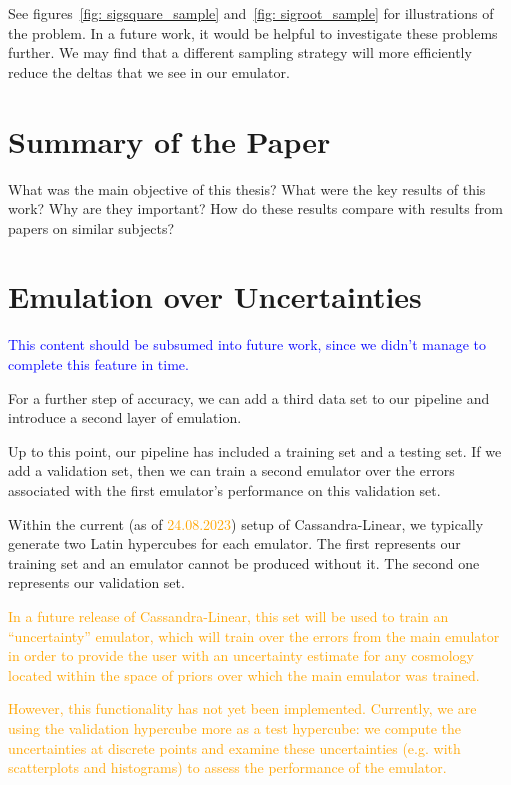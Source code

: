 See figures~\ref{fig: sigsquare_sample} and~\ref{fig: sigroot_sample} for
illustrations of the problem. In a future work, it would be helpful to
investigate these problems further. We may find that a different sampling
strategy will more efficiently reduce the deltas that we see in our emulator.

\section{Summary of the Paper}

What was the main objective of this thesis? What were the key results of this 
work? Why are they important? How do these results compare with results from 
papers on similar subjects?

\section{Emulation over Uncertainties}

\textcolor{blue}{This content should be subsumed into future work, since we
didn't manage to complete this feature in time.}

For a further step of accuracy, we can add a third data set to our pipeline
and introduce a second layer of emulation.

Up to this point, our pipeline has included a training set and a testing set.
If we add a validation set, then we can train a second emulator over the
errors associated with the first emulator's performance on this validation
set.

Within the current (as of \textcolor{orange}{24.08.2023}) setup of
Cassandra-Linear, we typically generate two Latin hypercubes for each
emulator. The first represents our training set and an emulator cannot be
produced without it. The second one represents our validation set.

\textcolor{orange}{In a future
release of Cassandra-Linear, this set will be used to train an ``uncertainty''
emulator, which will train over the errors from the main emulator in order to
provide the user with an uncertainty estimate for any cosmology located within
the space of priors over which the main emulator was trained.} 

\textcolor{orange}{However, this functionality has not yet been implemented. 
Currently, we are 
using the validation hypercube more as a test hypercube: we compute the 
uncertainties at discrete points and examine these uncertainties (e.g. with
scatterplots and histograms) to assess the performance of the emulator.}


